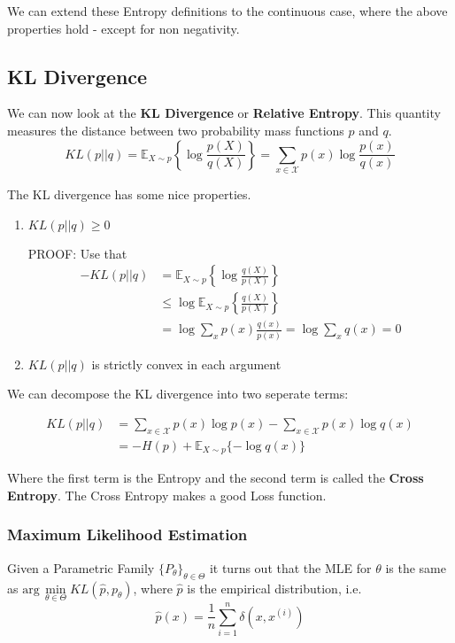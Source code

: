 \documentclass[]{article}
\begin{document}
We can extend these Entropy definitions to the continuous case, where the above properties hold - except for non negativity.

\subsection{KL Divergence}
We can now look at the \textbf{KL Divergence} or \textbf{Relative Entropy}. This quantity measures the distance between two probability mass functions $p$ and $q$.
\begin{equation}
KL(p||q) = \mathbb{E}_{X\sim p}\left\{\log \frac{p(X)}{q(X)}\right\} = \sum_{x\in\mathcal{X}}p(x)\log\frac{p(x)}{q(x)}
\end{equation}

The KL divergence has some nice properties.
\begin{enumerate}
	\item $KL(p||q) \ge 0$
	
	PROOF: Use that
	\begin{align*}
	-KL(p||q) &= \mathbb{E}_{X\sim p}\left\{\log \frac{q(X)}{p(X)}\right\}\\
	&\le \log \mathbb{E}_{X\sim p}\left\{\frac{q(X)}{p(X)}\right\} \\
	&= \log \sum_{x} p(x)\frac{q(x)}{p(x)} = \log \sum_{x} q(x) = 0
	\end{align*}
	
	\item $KL(p||q)$ is strictly convex in each argument
\end{enumerate}

We can decompose the KL divergence into two seperate terms:

\begin{align*} KL(p||q) &= \sum_{x\in\mathcal{X}}p(x)\log p(x) - \sum_{x\in\mathcal{X}}p(x)\log q(x) \\
&= -H(p) + \mathbb{E}_{X\sim p}\{-\log q(x)\}
\end{align*}

Where the first term is the Entropy and the second term is called the \textbf{Cross Entropy}. The Cross Entropy makes a good Loss function.

\subsubsection{Maximum Likelihood Estimation}

Given a Parametric Family $\{P_{\theta}\}_{\theta\in\Theta}$ it turns out that the MLE for $\theta$ is the same as $\text{arg}\,\min\limits_{\theta\in\Theta}
KL(\hat{p},p_{\theta})$, where $\hat{p}$ is the empirical distribution, i.e. 
\begin{equation}
\hat{p}(x) = \frac{1}{n}\sum_{i=1}^n\delta(x,x^{(i)})
\end{equation}
\end{document}
